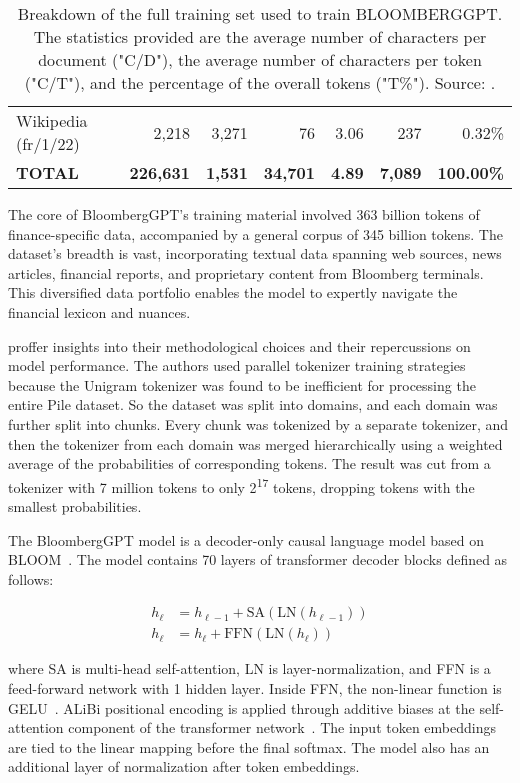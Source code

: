 \begin{table}[!h]
\begin{tabularx}{\textwidth}{lrrrrrr}
		Wikipedia (fr/1/22) & 2,218            & 3,271          & 76              & 3.06          & 237            & 0.32\%            \\
		\textbf{TOTAL}      & \textbf{226,631} & \textbf{1,531} & \textbf{34,701} & \textbf{4.89} & \textbf{7,089} & \textbf{100.00\%} \\
		\bottomrule
	\end{tabularx}
	\caption{Breakdown of the full training set used to train BLOOMBERGGPT. The statistics provided are the average number of characters per document ("C/D"), the average number of characters per token ("C/T"), and the percentage of the overall tokens ("T\%"). Source: \protect\textcite{wu2023bloomberggpt}.}
	\label{tab:training_set}
\end{table}

The core of BloombergGPT's training material involved 363 billion tokens of finance-specific data, accompanied by a general corpus of 345 billion tokens.
The dataset's breadth is vast, incorporating textual data spanning web sources, news articles, financial reports, and proprietary content from Bloomberg terminals.
This diversified data portfolio enables the model to expertly navigate the financial lexicon and nuances.

\textcite{wu2023bloomberggpt} proffer insights into their methodological choices and their repercussions on model performance.
The authors used parallel tokenizer training strategies because the Unigram tokenizer was found to be inefficient for processing the entire Pile dataset.
So the dataset was split into domains, and each domain was further split into chunks.
Every chunk was tokenized by a separate tokenizer, and then the tokenizer from each domain was merged hierarchically using a weighted average of the probabilities of corresponding tokens.
The result was cut from a tokenizer with 7 million tokens to only 2\textsuperscript{17} tokens, dropping tokens with the smallest probabilities.

The BloombergGPT model is a decoder-only causal language model based on BLOOM~\cite{workshop2023bloom}.
The model contains 70 layers of transformer decoder blocks defined as follows:

\begin{align*}
	h_{\ell} & = h_{\ell-1} + \text{SA}(\text{LN}(h_{\ell-1})) \\
	h_{\ell} & = h_{\ell} + \text{FFN}(\text{LN}(h_{\ell}))
\end{align*}

\noindent where SA is multi-head self-attention, LN is layer-normalization, and FFN is a feed-forward network with 1 hidden layer.
Inside FFN, the non-linear function is GELU~\cite{hendrycks2016gelu}.
ALiBi positional encoding is applied through additive biases at the self-attention component of the transformer network~\cite{lescao2022milliongpuhours}. The input token embeddings are tied to the linear mapping before the final softmax.
The model also has an additional layer of normalization after token embeddings.

